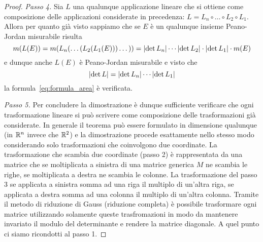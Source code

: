 \begin{proof}
\emph{Passo 4.}
Sia $L$ una qualunque applicazione lineare che si ottiene come
composizione delle applicazioni considerate in precedenza: 
$L= L_n\circ \dots  \circ L_2 \circ L_1$. 
Allora per quanto già visto sappiamo
che se $E$ è un qualunque insieme Peano-Jordan misurabile risulta
\[
m(L(E)) = m{\left( L_n(\dots(L_2(L_1(E)))\dots) \right)}
     = {\left|\det L_n\right|} \cdots {\left|\det L_2\right|} \cdot {\left|\det L_1\right|} \cdot m(E)
\]
e dunque anche $L(E)$ è Peano-Jordan misurabile e visto che
\[
 {\left|\det L\right|} = {\left|\det L_n\right|} \cdots {\left|\det L_1\right|}
\]
la formula~\eqref{eq:formula_area} è verificata.

\emph{Passo 5.}
Per concludere la dimostrazione è dunque sufficiente
verificare che ogni trasformazione lineare si può scrivere come composizione delle trasformazioni già considerate.
In generale il teorema può essere formulato in dimensione qualunque (in ${\mathbb R}^n$ invece che ${\mathbb R}^2$) 
e la dimostrazione procede esattamente nello stesso modo considerando solo trasformazioni che coinvolgono due coordinate. 
La trasformazione che scambia due coordinate (passo 2) è rappresentata da una matrice che se moltiplicata 
a sinistra di una matrice generica $M$ ne scambia le righe, se moltiplicata a destra ne scambia le colonne. 
La trasformazione del passo 3 se applicata a sinistra somma ad una riga il multiplo di un'altra riga, 
se applicata a destra somma ad una colonna il multiplo di un'altra colonna.
Tramite il metodo di riduzione di Gauss (riduzione completa) è possibile trasformare ogni matrice 
utilizzando solamente queste trasfromazioni in modo da mantenere invariato il modulo del determinante 
e rendere la matrice diagonale. A quel punto ci siamo ricondotti al passo 1.


\end{proof}
